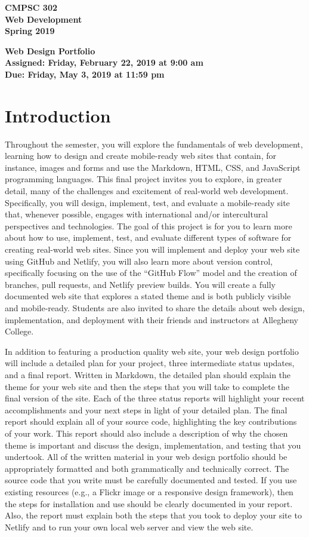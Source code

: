 \documentclass[11pt]{article}
\newcommand{\assignmentduedate}{May 3}
\newcommand{\assignmentassignedate}{February 22}
\newcommand{\labyear}{2019}
\newcommand{\labday}{Friday}
\newcommand{\labdueday}{Friday}
\newcommand{\labtime}{9:00 am}
\newcommand{\labduetime}{11:59 pm}
\newcommand{\assigneddate}{Assigned: \labday, \assignmentassignedate, \labyear{} at \labtime{}}
\newcommand{\duedate}{Due: \labdueday, \assignmentduedate, \labyear{} at \labduetime{}}
\newcommand{\labtitle}[1]
{
  \begin{center}
    \begin{center}
      \bf
      CMPSC 302\\Web Development\\
      Spring 2019\\
      \medskip
    \end{center}
    \bf
    #1
  \end{center}
}
\begin{document}
\thispagestyle{empty}

\labtitle{Web Design Portfolio \\ \assigneddate{} \\ \duedate{}}

\section*{Introduction}

Throughout the semester, you will explore the fundamentals of web development,
learning how to design and create mobile-ready web sites that contain, for
instance, images and forms and use the Markdown, HTML, CSS, and JavaScript
programming languages. This final project invites you to explore, in greater
detail, many of the  challenges and excitement of real-world web development.
%
Specifically, you will design, implement, test, and evaluate a mobile-ready site
that, whenever possible, engages with international and/or intercultural
perspectives and technologies. The goal of this project is for you to learn more
about how to use, implement, test, and evaluate different types of software for
creating real-world web sites.
%
Since you will implement and deploy your web site using GitHub and Netlify, you
will also learn more about version control, specifically focusing on the use of
the ``GitHub Flow'' model and the creation of branches, pull requests, and
Netlify preview builds.
%
You will create a fully documented web site that explores a stated theme and is
both publicly visible and mobile-ready.
%
Students are also invited to share the details about web design, implementation,
and deployment with their friends and instructors at Allegheny College.

In addition to featuring a production quality web site, your web design
portfolio will include a detailed plan for your project, three intermediate
status updates, and a final report.
%
Written in Markdown, the detailed plan should explain the theme for your web
site and then the steps that you will take to complete the final version of the
site.
%
Each of the three status reports will highlight your recent accomplishments and
your next steps in light of your detailed plan.
%
The final report should explain all of your source code, highlighting the key
contributions of your work. This report should also include a description of why
the chosen theme is important and discuss the design, implementation, and
testing that you undertook.
%
All of the written material in your web design portfolio should be appropriately
formatted and both grammatically and technically correct. The source code that
you write must be carefully documented and tested. If you use existing resources
(e.g., a Flickr image or a responsive design framework), then the steps for
installation and use should be clearly documented in your report. Also, the
report must explain both the steps that you took to deploy your site to Netlify
and to run your own local web server and view the web site.
\end{document}
